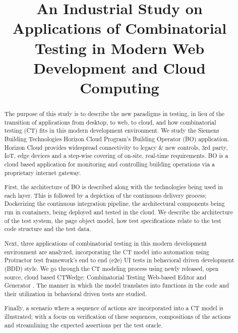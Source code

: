 \documentclass[conference]{IEEEtran}
\begin{document}
\title{An Industrial Study on Applications of Combinatorial Testing in Modern Web Development and Cloud Computing}


\author{
}

\maketitle


\begin{abstract}
The purpose of this study is to describe the new paradigms in testing,
in lieu of the transition of applications from desktop, to web, to cloud, and how combinatorial testing (CT) fits in this modern development environment. 
We study the Siemens Building Technologies Horizon Cloud Program's Building Operator (BO) application.
Horizon Cloud provides widespread connectivity to legacy \& new controls, 3rd party, IoT, edge devices and a step-wise covering of on-site, real-time requirements. 
BO is a cloud based application for monitoring and controlling building operations via a proprietary internet gateway.

First, the architecture of BO is described along with the technologies being used in each layer. 
This is followed by a depiction of the continuous delivery process; Dockerizing \cite{wiki:docker} the continuous integration pipeline,
the architectural components being run in containers, being deployed and tested in the cloud. 
We describe the architecture of the test system, the page object model, how test specifications relate to the test code structure and the test data. 

Next, three applications of combinatorial testing in this modern development environment are analyzed,
incorporating the CT model into automation using Protractor test framework's end to end (e2e) UI tests in behavioral driven development (BDD) style. 
We go through the CT modeling process using newly released, open source, cloud based CTWedge: Combinatorial Testing Web-based Editor and Generator \cite{gargantini2018migrating}. 
The manner in which the model translates into functions in the code and their utilization in behavioral driven tests are studied.

Finally, a scenario where a sequence of actions are incorporated into a CT model is illustrated;
with a focus on verification of these sequences, compositions of the actions and streamlining the expected assertions per the test oracle.

\end{abstract}
\end{document}
